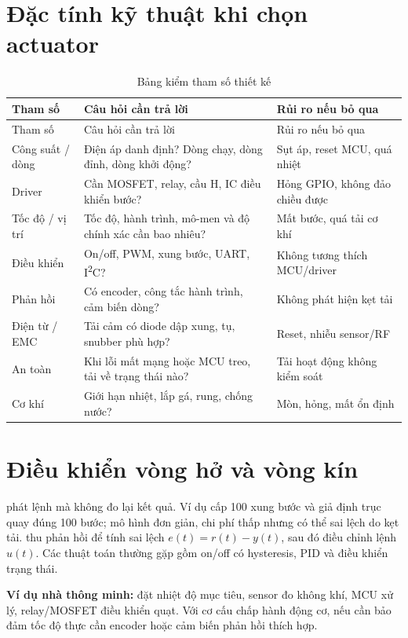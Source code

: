 \section{Đặc tính kỹ thuật khi chọn actuator}
\begin{longtable}{p{30mm}p{60mm}p{55mm}}
\caption{Bảng kiểm tham số thiết kế}\label{tab:actreq}\\
\toprule
Tham số & Câu hỏi cần trả lời & Rủi ro nếu bỏ qua\\\midrule\endfirsthead
\toprule Tham số & Câu hỏi cần trả lời & Rủi ro nếu bỏ qua\\\midrule\endhead
Công suất / dòng & Điện áp danh định? Dòng chạy, dòng đỉnh, dòng khởi động? & Sụt áp, reset MCU, quá nhiệt\\
Driver & Cần MOSFET, relay, cầu H, IC điều khiển bước? & Hỏng GPIO, không đảo chiều được\\
Tốc độ / vị trí & Tốc độ, hành trình, mô-men và độ chính xác cần bao nhiêu? & Mất bước, quá tải cơ khí\\
Điều khiển & On/off, PWM, xung bước, UART, I\textsuperscript{2}C? & Không tương thích MCU/driver\\
Phản hồi & Có encoder, công tắc hành trình, cảm biến dòng? & Không phát hiện kẹt tải\\
Điện từ / EMC & Tải cảm có diode dập xung, tụ, snubber phù hợp? & Reset, nhiễu sensor/RF\\
An toàn & Khi lỗi mất mạng hoặc MCU treo, tải về trạng thái nào? & Tải hoạt động không kiểm soát\\
Cơ khí & Giới hạn nhiệt, lắp gá, rung, chống nước? & Mòn, hỏng, mất ổn định\\\bottomrule
\end{longtable}

\section{Điều khiển vòng hở và vòng kín}
 phát lệnh mà không đo lại kết quả. Ví dụ cấp 100 xung bước và giả định trục quay đúng 100 bước; mô hình đơn giản, chi phí thấp nhưng có thể sai lệch do kẹt tải.  thu phản hồi để tính sai lệch $e(t)=r(t)-y(t)$, sau đó điều chỉnh lệnh $u(t)$. Các thuật toán thường gặp gồm on/off có hysteresis, PID và điều khiển trạng thái.

\begin{tipbox}
\textbf{Ví dụ nhà thông minh:} đặt nhiệt độ mục tiêu, sensor đo không khí, MCU xử lý, relay/MOSFET điều khiển quạt. Với cơ cấu chấp hành động cơ, nếu cần bảo đảm tốc độ thực cần encoder hoặc cảm biến phản hồi thích hợp.
\end{tipbox}

